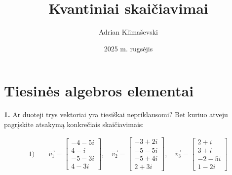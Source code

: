 \documentclass{article}
\title{Kvantiniai skaičiavimai}
\author{Adrian Klimaševski}
\date{2025 m. rugsėjis}
\begin{document}
\maketitle

\section*{Tiesinės algebros elementai}

\textbf{1.} Ar duoteji trys vektoriai yra tiesiškai nepriklausomi? Bet kuriuo atveju pagrįskite atsakymą konkrečiais skaičiavimais:


\begin{align}
\text{1)}\qquad
\overrightarrow{v_1}=
\begin{bmatrix}
-4-5i \\
4-i\\
-5-3i\\
4-3i
\end{bmatrix}, \quad
\overrightarrow{v_2}=
\begin{bmatrix}
-3+2i \\
-5-5i\\
-5+4i\\
2+3i 
\end{bmatrix}, \quad
\overrightarrow{v_3}=
\begin{bmatrix}
2+i \\
3+i\\
-2-5i\\
1-2i
\end{bmatrix} \nonumber
\end{align}




\end{document}
